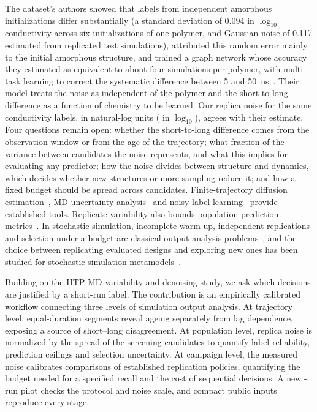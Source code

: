 \documentclass[preprint,12pt]{elsarticle}
\begin{document}
The dataset's authors showed that labels from independent amorphous initializations differ
substantially (a standard deviation of 0.094 in $\log_{10}$ conductivity across six
initializations of one polymer, and Gaussian noise of 0.117 estimated from replicated test
simulations), attributed this random error mainly to the initial amorphous structure, and
trained a graph network whose accuracy they estimated as equivalent to about four simulations per
polymer, with multi-task learning to correct the systematic difference between 5 and
\SI{50}{\nano\second}~\cite{Xie2022Accelerating}. Their model treats the noise as independent of
the polymer and the short-to-long difference as a function of chemistry to be learned. Our
replica noise for the same conductivity labels, \genCondSd{} in natural-log units
(\genCondSdLogTen{} in $\log_{10}$), agrees with their estimate. Four questions remain open: whether
the short-to-long difference comes from the observation window or from the age of the
trajectory; what fraction of the variance between candidates the noise represents, and what this
implies for evaluating any predictor; how the noise divides between structure and dynamics,
which decides whether new structures or more sampling reduce it; and how a fixed budget should
be spread across candidates. Finite-trajectory diffusion estimation~\cite{He2018Variances,Bullerjahn2020Optimal,McCluskey2025Accurate,McCluskey2024kinisi},
MD uncertainty analysis~\cite{Grossfield2018BestPractices,Maginn2018BestPractices} and noisy-label
learning~\cite{Frenay2014LabelNoise} provide established tools. Replicate variability also bounds
population prediction metrics~\cite{Brown2009Skepticism,Kramer2012Ki,LageCastellanos2019NoiseCeiling}.
In stochastic simulation, incomplete warm-up, independent replications and selection under a
budget are classical output-analysis problems~\cite{White1997MSER,Hoad2010WarmUp,Alexopoulos1998Output,Kim2006SelectingBest,Chen2000OCBA},
and the choice between replicating evaluated designs and exploring new ones has been studied for
stochastic simulation metamodels~\cite{Ankenman2010StochasticKriging,Binois2019Replication}.

Building on the HTP-MD variability and denoising study, we ask which decisions are justified by
a short-run label. The contribution is an empirically calibrated workflow connecting three
levels of simulation output analysis. At trajectory level, equal-duration segments reveal
ageing separately from lag dependence, exposing a source of short--long disagreement. At
population level, replica noise is normalized by the spread of the screening candidates to
quantify label reliability, prediction ceilings and selection uncertainty. At campaign level,
the measured noise calibrates comparisons of established replication policies, quantifying the
budget needed for a specified recall and the cost of sequential decisions. A new \pilRuns{}-run
pilot checks the protocol and noise scale, and compact public inputs reproduce every stage.
\end{document}
